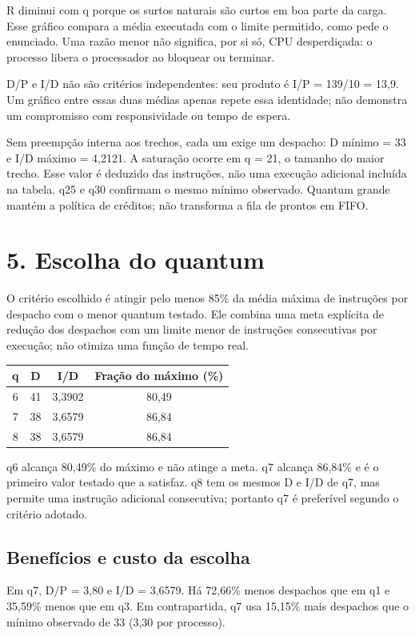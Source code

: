 \documentclass[10pt,a4paper]{article}
\begin{document}
R diminui com q porque os surtos naturais são curtos em boa parte da carga. Esse gráfico compara a média executada com o limite permitido, como pede o enunciado. Uma razão menor não significa, por si só, CPU desperdiçada: o processo libera o processador ao bloquear ou terminar.

D/P e I/D não são critérios independentes: seu produto é I/P = 139/10 = 13,9. Um gráfico entre essas duas médias apenas repete essa identidade; não demonstra um compromisso com responsividade ou tempo de espera.

Sem preempção interna aos trechos, cada um exige um despacho: D mínimo = 33 e I/D máximo = 4,2121. A saturação ocorre em q = 21, o tamanho do maior trecho. Esse valor é deduzido das instruções, não uma execução adicional incluída na tabela. q25 e q30 confirmam o mesmo mínimo observado. Quantum grande mantém a política de créditos; não transforma a fila de prontos em FIFO.

\clearpage
\section*{5. Escolha do quantum}
O critério escolhido é atingir pelo menos 85\% da média máxima de instruções por despacho com o menor quantum testado. Ele combina uma meta explícita de redução dos despachos com um limite menor de instruções consecutivas por execução; não otimiza uma função de tempo real.

\begin{center}
\small
\begin{tabular}{cccc}
\hline
\textbf{q} & \textbf{D} & \textbf{I/D} & \textbf{Fração do máximo (\%)} \\
\hline
6 & 41 & 3,3902 & 80,49 \\
7 & 38 & 3,6579 & 86,84 \\
8 & 38 & 3,6579 & 86,84 \\
\hline
\end{tabular}
\end{center}
q6 alcança 80,49\% do máximo e não atinge a meta. q7 alcança 86,84\% e é o primeiro valor testado que a satisfaz. q8 tem os mesmos D e I/D de q7, mas permite uma instrução adicional consecutiva; portanto q7 é preferível segundo o critério adotado.

\subsection*{Benefícios e custo da escolha}
Em q7, D/P = 3,80 e I/D = 3,6579. Há 72,66\% menos despachos que em q1 e 35,59\% menos que em q3. Em contrapartida, q7 usa 15,15\% mais despachos que o mínimo observado de 33 (3,30 por processo).
\end{document}

